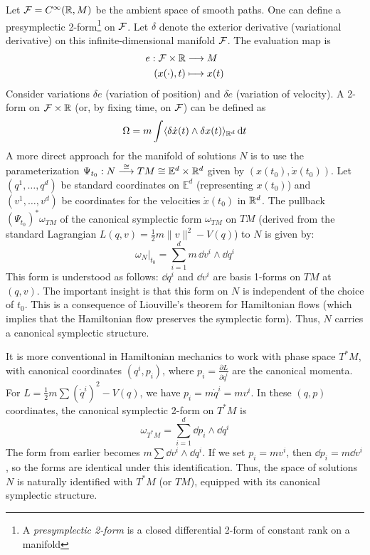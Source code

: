 Let $\mathcal{F} = C^\infty(\mathbb{R}, M)$ be the ambient space of smooth paths. One can define a presymplectic 2-form\footnote{A \textit{presymplectic 2-form} is a closed differential 2-form of constant rank on a manifold} on $\mathcal{F}$. Let $\delta$ denote the exterior derivative (variational derivative) on this infinite-dimensional manifold $\mathcal{F}$. The evaluation map is
\begin{align*}
e: \mathcal{F} \times \mathbb{R} &\longrightarrow M \\
(x(\cdot), t) &\longmapsto x(t)
\end{align*}
Consider variations $\delta e$ (variation of position) and $\delta \dot{e}$ (variation of velocity). A 2-form on $\mathcal{F} \times \mathbb{R}$ (or, by fixing time, on $\mathcal{F}$) can be defined as
\[ \Omega = m \int \langle \delta \dot{x}(t) \wedge \delta x(t) \rangle_{\mathbb{R}^d} \, \dd t \]
A more direct approach for the manifold of solutions $N$ is to use the parameterization $\Psi_{t_0}: N \stackrel{\cong}{\longrightarrow} TM \cong \mathbb{E}^d \times \mathbb{R}^d$ given by $(x(t_0), \dot{x}(t_0))$. Let $(q^1, \dots, q^d)$ be standard coordinates on $\mathbb{E}^d$ (representing $x(t_0)$) and $(v^1, \dots, v^d)$ be coordinates for the velocities $\dot{x}(t_0)$ in $\mathbb{R}^d$. The pullback $(\Psi_{t_0})^*\omega_{TM}$ of the canonical symplectic form $\omega_{TM}$ on $TM$ (derived from the standard Lagrangian $L(q,v) = \frac{1}{2}m\|v\|^2 - V(q)$) to $N$ is given by:
\[ \omega_N \big|_{t_0} = \sum_{i=1}^d m \, \dd v^i \wedge \dd q^i \]
This form is understood as follows: $\dd q^i$ and $\dd v^i$ are basis 1-forms on $TM$ at $(q,v)$. The important insight is that this form on $N$ is independent of the choice of $t_0$. This is a consequence of Liouville's theorem for Hamiltonian flows (which implies that the Hamiltonian flow preserves the symplectic form). Thus, $N$ carries a canonical symplectic structure.

\begin{remark}
It is more conventional in Hamiltonian mechanics to work with phase space $T^*M$, with canonical coordinates $(q^i, p_i)$, where $p_i = \frac{\partial L}{\partial \dot{q}^i}$ are the canonical momenta. For $L = \frac{1}{2}m\sum (\dot{q}^i)^2 - V(q)$, we have $p_i = m\dot{q}^i = mv^i$. In these $(q,p)$ coordinates, the canonical symplectic 2-form on $T^*M$ is
\[ \omega_{T^*M} = \sum_{i=1}^d \dd p_i \wedge \dd q^i \]
The form from earlier becomes $m \sum \dd v^i \wedge \dd q^i$. If we set $p_i = mv^i$, then $\dd p_i = m \dd v^i$, so the forms are identical under this identification. Thus, the space of solutions $N$ is naturally identified with $T^*M$ (or $TM$), equipped with its canonical symplectic structure.
\end{remark}


